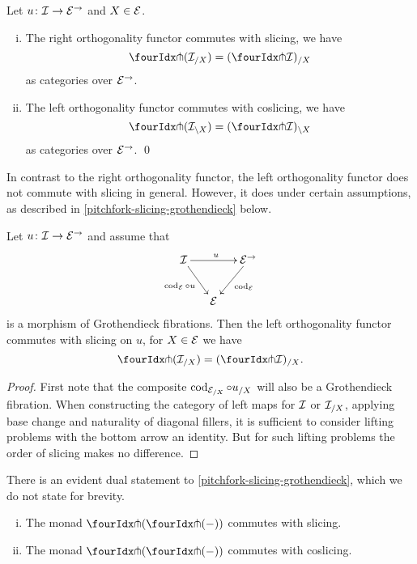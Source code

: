 \documentclass[reqno,10pt,a4paper,oneside,draft]{amsart}
\begin{document}
\begin{proposition} \label{pitchfork-slicing}
Let $u \co \cal{I} \to \catE^\to$ and $X \in \cal{E}$.
\begin{enumerate}[(i)]
\item The right orthogonality functor commutes with slicing, \ie we have
\[
  \liftr{(\cal{I}_{/X})} = (\liftr{\cal{I}})_{/X}
\]
as categories over $\catE^\to$.
\item The left orthogonality functor commutes with coslicing, \ie we have
\[
  \liftl{(\cal{I}_{\backslash X})} = (\liftl{\cal{I}})_{\backslash X}
\]
as categories over $\catE^\to$.
\qed
\end{enumerate}
\end{proposition}

In contrast to the right orthogonality functor, the left orthogonality functor does not commute with slicing in general.
However, it does under certain assumptions, as described in \cref{pitchfork-slicing-grothendieck} below.

\begin{proposition} \label{pitchfork-slicing-grothendieck}
Let $u \co \cal{I} \to \cal{E}^\to$ and assume that
\[
\xymatrix@C-1em{
  \cal{I}
  \ar[rr]^{u}
  \ar[dr]_{\cod_{\cal{E}} \cc u}
&&
  \cal{E}^\to
  \ar[dl]^{\cod_{\cal{E}}}
\\&
  \cal{E}
}
\]
is a morphism of Grothendieck fibrations.
Then the left orthogonality functor commutes with slicing on $u$, \ie for $X \in \cal{E}$ we have
\[
  \liftl{(\cal{I}_{/X})} = (\liftl{\cal{I}})_{/X}
.\]
\end{proposition}

\begin{proof}
First note that the composite $\cod_{\cal{E}_{/X}} \cc u_{/X}$ will also be a Grothendieck fibration.
When constructing the category of left maps for $\cal{I}$ or $\cal{I}_{/X}$, 
applying base change and naturality of diagonal fillers, 
it is sufficient  to consider lifting problems with the bottom arrow an identity.
But for such lifting problems the order of slicing makes no difference.
\end{proof}

There is an evident dual statement to \cref{pitchfork-slicing-grothendieck}, which we do not state for brevity.

\begin{corollary} \label{pitchfork-slicing-monad}
\leavevmode
\begin{enumerate}[(i)]
\item The monad $\liftl{(\liftr{(-)})}$ commutes with slicing.
\item The monad $\liftr{(\liftl{(-)})}$ commutes with coslicing.
\end{enumerate}
\end{corollary}
\end{document}
